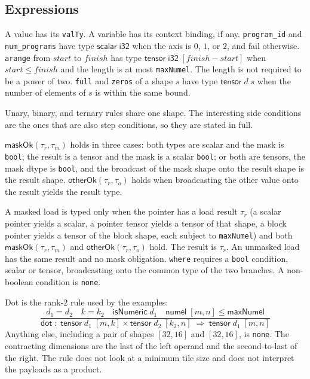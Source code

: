 \documentclass[a4paper,UKenglish,anonymous,cleveref,autoref]{lipics-v2021}
\begin{document}
\subsection{Expressions}

A value has its \texttt{valTy}.
A variable has its context binding, if any.
\texttt{program\_id} and \texttt{num\_programs} have type \(\mathsf{scalar}\;\mathsf{i32}\) when the axis is \(0\), \(1\), or \(2\), and fail otherwise.
\texttt{arange} from \(\mathit{start}\) to \(\mathit{finish}\) has type \(\mathsf{tensor}\;\mathsf{i32}\;[\mathit{finish}-\mathit{start}]\) when \(\mathit{start} \le \mathit{finish}\) and the length is at most \texttt{maxNumel}.
The length is not required to be a power of two.
\texttt{full} and \texttt{zeros} of a shape \(s\) have type \(\mathsf{tensor}\;d\;s\) when the number of elements of \(s\) is within the same bound.

Unary, binary, and ternary rules share one shape.
The interesting side conditions are the ones that are also step conditions, so they are stated in full.

\begin{definition}
\label{def:mask}
\(\mathsf{maskOk}(\tau_r, \tau_m)\) holds in three cases: both types are scalar and the mask is \texttt{bool}; the result is a tensor and the mask is a scalar \texttt{bool}; or both are tensors, the mask dtype is \texttt{bool}, and the broadcast of the mask shape onto the result shape is the result shape.
\(\mathsf{otherOk}(\tau_r, \tau_o)\) holds when broadcasting the other value onto the result yields the result type.
\end{definition}

A masked load is typed only when the pointer has a load result \(\tau_r\) (a scalar pointer yields a scalar, a pointer tensor yields a tensor of that shape, a block pointer yields a tensor of the block shape, each subject to \texttt{maxNumel}) and both \(\mathsf{maskOk}(\tau_r, \tau_m)\) and \(\mathsf{otherOk}(\tau_r, \tau_o)\) hold.
The result is \(\tau_r\).
An unmasked load has the same result and no mask obligation.
\texttt{where} requires a \texttt{bool} condition, scalar or tensor, broadcasting onto the common type of the two branches.
A non-boolean condition is \texttt{none}.

Dot is the rank-2 rule used by the examples:
\[
\frac{
d_1 = d_2
\quad
k = k_2
\quad
\mathsf{isNumeric}\;d_1
\quad
\mathsf{numel}\;[m,n] \le \mathsf{maxNumel}
}{
\mathsf{dot}\;:\;
\mathsf{tensor}\;d_1\;[m,k]
\times
\mathsf{tensor}\;d_2\;[k_2,n]
\;\Rightarrow\;
\mathsf{tensor}\;d_1\;[m,n]
}
\]
Anything else, including a pair of shapes \([32,16]\) and \([32,16]\), is \texttt{none}.
The contracting dimensions are the last of the left operand and the second-to-last of the right.
The rule does not look at a minimum tile size and does not interpret the payloads as a product.
\end{document}

